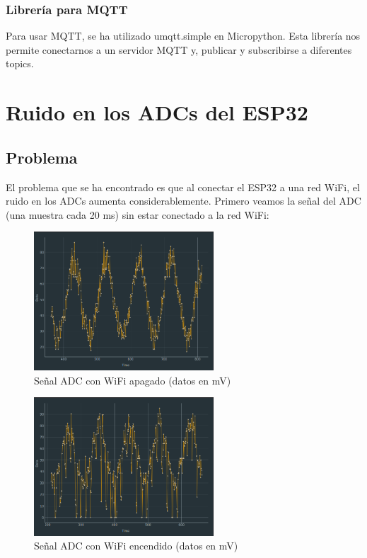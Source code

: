 \begin{titlepage}
\subsubsection{Librería para MQTT}
Para usar MQTT, se ha utilizado umqtt.simple\cite{ref22} en Micropython. Esta librería nos permite conectarnos a un servidor MQTT y, publicar y subscribirse a diferentes topics.\\
\newpage
\section{Ruido en los ADCs del ESP32}
\subsection{Problema}
El problema que se ha encontrado es que al conectar el ESP32 a una red WiFi, el ruido en los ADCs aumenta considerablemente. Primero veamos la señal del ADC (una muestra cada 20 ms) sin estar conectado a la red WiFi:
\begin{figure}[h!]
	\centering
	\includegraphics[width=0.60\textwidth]{imagenes/ruido_wifi_off_mV.png}
	\caption{Señal ADC con WiFi apagado (datos en mV)}
\end{figure}

\begin{figure}[h!]
	\centering
	\includegraphics[width=0.60\textwidth]{imagenes/ruido_wifi_on_mV.png}
	\caption{Señal ADC con WiFi encendido (datos en mV)}
\end{figure}
\newpage

\end{titlepage}
